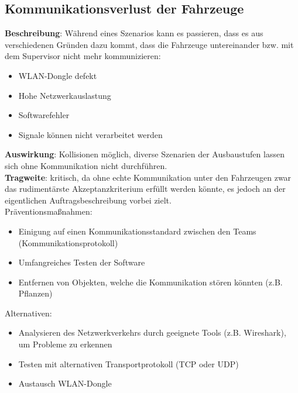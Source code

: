 \documentclass[a4paper, 12pt, titlepage]{scrartcl}
\begin{document}
	\subsection{Kommunikationsverlust der Fahrzeuge}
		\textbf{Beschreibung}: W\"ahrend eines Szenarios kann es passieren, dass es aus verschiedenen Gr\"unden dazu kommt, dass die Fahrzeuge untereinander bzw. mit dem Supervisor nicht mehr kommunizieren:
			\begin{itemize}
				\item WLAN-Dongle defekt
				\item Hohe Netzwerkauslastung
				\item Softwarefehler
				\item Signale k\"onnen nicht verarbeitet werden
			\end{itemize}
		\textbf{Auswirkung}: Kollisionen m\"oglich, diverse Szenarien der Ausbaustufen lassen sich ohne Kommunikation nicht durchf\"uhren.\\
		\textbf{Tragweite}: kritisch, da ohne echte Kommunikation unter den Fahrzeugen zwar das rudiment\"arste Akzeptanzkriterium erf\"ullt werden k\"onnte, es jedoch an der eigentlichen Auftragsbeschreibung vorbei zielt.\\
		Pr\"aventionsma\ss nahmen:
			\begin{itemize}
				\item Einigung auf einen Kommunikationsstandard zwischen den Teams (Kommunikationsprotokoll)
				\item Umfangreiches Testen der Software
				\item Entfernen von Objekten, welche die Kommunikation st\"oren k\"onnten  (z.B. Pflanzen)
			\end{itemize}
		Alternativen: 
			\begin{itemize}
				\item Analysieren des Netzwerkverkehrs durch geeignete Tools (z.B. Wireshark), um Probleme zu erkennen
				\item Testen mit alternativen Transportprotokoll (TCP oder UDP)
				\item Austausch WLAN-Dongle
			\end{itemize}
		
\end{document}
